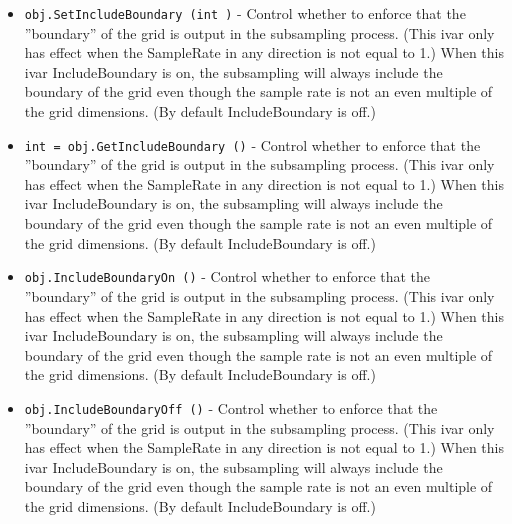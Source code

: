 \begin{itemize}
\item  \verb|obj.SetIncludeBoundary (int )| -  Control whether to enforce that the ''boundary'' of the grid is output in
 the subsampling process. (This ivar only has effect when the SampleRate
 in any direction is not equal to 1.) When this ivar IncludeBoundary is
 on, the subsampling will always include the boundary of the grid even
 though the sample rate is not an even multiple of the grid
 dimensions. (By default IncludeBoundary is off.)

\item  \verb|int = obj.GetIncludeBoundary ()| -  Control whether to enforce that the ''boundary'' of the grid is output in
 the subsampling process. (This ivar only has effect when the SampleRate
 in any direction is not equal to 1.) When this ivar IncludeBoundary is
 on, the subsampling will always include the boundary of the grid even
 though the sample rate is not an even multiple of the grid
 dimensions. (By default IncludeBoundary is off.)

\item  \verb|obj.IncludeBoundaryOn ()| -  Control whether to enforce that the ''boundary'' of the grid is output in
 the subsampling process. (This ivar only has effect when the SampleRate
 in any direction is not equal to 1.) When this ivar IncludeBoundary is
 on, the subsampling will always include the boundary of the grid even
 though the sample rate is not an even multiple of the grid
 dimensions. (By default IncludeBoundary is off.)

\item  \verb|obj.IncludeBoundaryOff ()| -  Control whether to enforce that the ''boundary'' of the grid is output in
 the subsampling process. (This ivar only has effect when the SampleRate
 in any direction is not equal to 1.) When this ivar IncludeBoundary is
 on, the subsampling will always include the boundary of the grid even
 though the sample rate is not an even multiple of the grid
 dimensions. (By default IncludeBoundary is off.)

\end{itemize}
